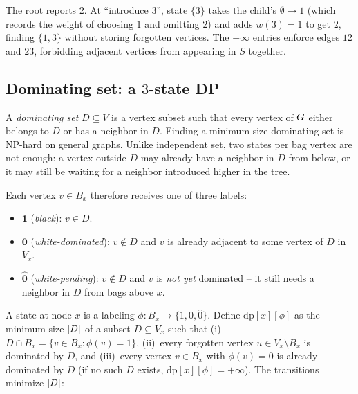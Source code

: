 The root reports $2$. At ``introduce $3$'', state $\{3\}$ takes the child's
$\emptyset\mapsto 1$ (which records the weight of choosing $1$ and omitting $2$)
and adds $w(3)=1$ to get $2$, finding $\{1,3\}$ without storing forgotten vertices.
The $-\infty$ entries enforce edges $12$ and $23$, forbidding adjacent vertices
from appearing in $S$ together.

\subsection{Dominating set: a $3$-state DP}

A \emph{dominating set} $D\subseteq V$ is a vertex subset such that every vertex of
$G$ either belongs to $D$ or has a neighbor in $D$. Finding a minimum-size
dominating set is NP-hard on general graphs. Unlike independent set, two states per
bag vertex are not enough: a vertex outside $D$ may already have a neighbor in $D$
from below, or it may still be waiting for a neighbor introduced higher in the
tree.

Each vertex $v\in B_x$ therefore receives one of three labels:
\begin{itemize}
  \item \textcolor{sourceblue}{$\mathbf{1}$} (\emph{black}): $v\in D$.
  \item \textcolor{targetgreen}{$\mathbf{0}$} (\emph{white-dominated}): $v\notin
        D$ and $v$ is already adjacent to some vertex of $D$ in $V_x$.
  \item \textcolor{quotientorange}{$\hat{\mathbf{0}}$} (\emph{white-pending}):
        $v\notin D$ and $v$ is \emph{not yet} dominated -- it still needs a
        neighbor in $D$ from bags above $x$.
\end{itemize}
A state at node $x$ is a labeling $\phi:B_x\to\{1,0,\hat 0\}$. Define
$\mathrm{dp}[x][\phi]$ as the minimum size $\lvert D\rvert$ of a subset $D\subseteq V_x$
such that (i)~$D\cap B_x=\{v\in B_x : \phi(v)=1\}$, (ii)~every forgotten vertex
$u\in V_x\setminus B_x$ is dominated by $D$, and (iii)~every vertex $v\in B_x$
with $\phi(v)=0$ is already dominated by $D$ (if no such $D$ exists,
$\mathrm{dp}[x][\phi]=+\infty$). The transitions minimize $\lvert D\rvert$:

